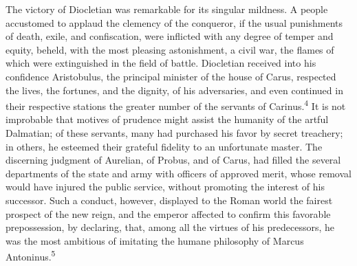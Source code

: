 The victory of Diocletian was remarkable for its singular
mildness. A people accustomed to applaud the clemency of the
conqueror, if the usual punishments of death, exile, and
confiscation, were inflicted with any degree of temper and
equity, beheld, with the most pleasing astonishment, a civil war,
the flames of which were extinguished in the field of battle.
Diocletian received into his confidence Aristobulus, the
principal minister of the house of Carus, respected the lives,
the fortunes, and the dignity, of his adversaries, and even
continued in their respective stations the greater number of the
servants of Carinus.\textsuperscript{4} It is not improbable that motives of
prudence might assist the humanity of the artful Dalmatian; of
these servants, many had purchased his favor by secret treachery;
in others, he esteemed their grateful fidelity to an unfortunate
master. The discerning judgment of Aurelian, of Probus, and of
Carus, had filled the several departments of the state and army
with officers of approved merit, whose removal would have injured
the public service, without promoting the interest of his
successor. Such a conduct, however, displayed to the Roman world
the fairest prospect of the new reign, and the emperor affected
to confirm this favorable prepossession, by declaring, that,
among all the virtues of his predecessors, he was the most
ambitious of imitating the humane philosophy of Marcus Antoninus.\textsuperscript{5}



